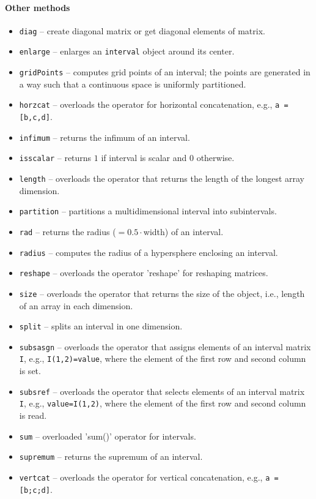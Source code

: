 \paragraph{Other methods}

\begin{itemize}
    \item \texttt{diag} -- create diagonal matrix or get diagonal elements of matrix.
    \item \texttt{enlarge} -- enlarges an \texttt{interval} object around its center.
    \item \texttt{gridPoints} -- computes grid points of an interval; the points are generated in a way such that a continuous space is uniformly partitioned.
    \item \texttt{horzcat} -- overloads the operator for horizontal concatenation, e.g., \texttt{a = [b,c,d]}.
    \item \texttt{infimum} -- returns the infimum of an interval.
    \item \texttt{isscalar} -- returns $1$ if interval is scalar and $0$ otherwise.
    \item \texttt{length} -- overloads the operator that returns the length of the longest array dimension.
    \item \texttt{partition} -- partitions a multidimensional interval into subintervals.
    \item \texttt{rad} -- returns the radius ($=0.5 \cdot$width) of an interval.
    \item \texttt{radius} -- computes the radius of a hypersphere enclosing an interval.
    \item \texttt{reshape} -- overloads the operator 'reshape' for reshaping matrices.
    \item \texttt{size} -- overloads the operator that returns the size of the object, i.e., length of an array in each dimension.
    \item \texttt{split} -- splits an interval in one dimension.
    \item \texttt{subsasgn} -- overloads the operator that assigns elements of an interval matrix \texttt{I}, e.g., \texttt{I(1,2)=value}, where the element of the first row and second column is set.
    \item \texttt{subsref} -- overloads the operator that selects elements of an interval matrix \texttt{I}, e.g., \texttt{value=I(1,2)}, where the element of the first row and second column is read.
    \item \texttt{sum} -- overloaded 'sum()' operator for intervals.
    \item \texttt{supremum} -- returns the supremum of an interval.
    \item \texttt{vertcat} -- overloads the operator for vertical concatenation, e.g., \texttt{a = [b;c;d]}.
\end{itemize}


